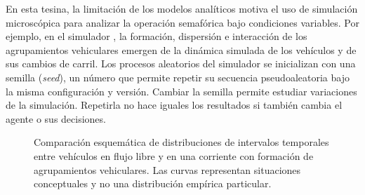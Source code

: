 En esta tesina, la limitación de los modelos analíticos motiva el uso de simulación microscópica para analizar la operación semafórica bajo condiciones variables. Por ejemplo, en el simulador , la formación, dispersión e interacción de los agrupamientos vehiculares emergen de la dinámica simulada de los vehículos y de sus cambios de carril. Los procesos aleatorios del simulador se inicializan con una \gls{semilla} (\textit{seed}), un número que permite repetir su secuencia pseudoaleatoria bajo la misma configuración y versión. Cambiar la semilla permite estudiar variaciones de la simulación. Repetirla no hace iguales los resultados si también cambia el agente o sus decisiones.

\begin{figure}[!htbp]
\centering
{}
\caption{Comparación esquemática de distribuciones de intervalos temporales entre vehículos en flujo libre y en una corriente con formación de agrupamientos vehiculares. Las curvas representan situaciones conceptuales y no una distribución empírica particular.}
\label{fig:distribucion_intervalos}
\end{figure}

